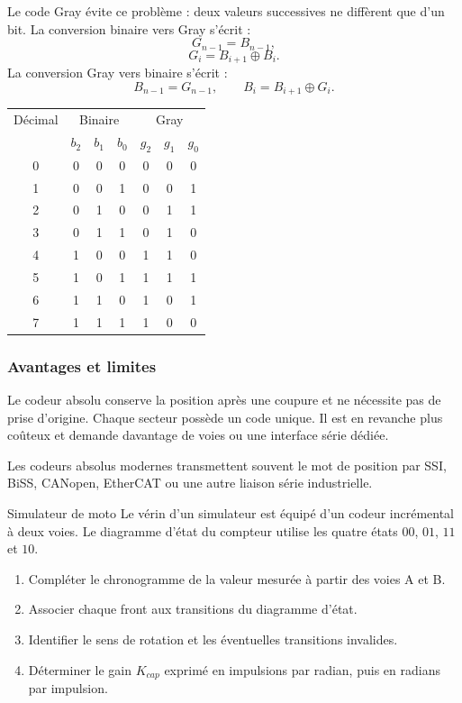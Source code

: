 Le code Gray évite ce problème : deux valeurs successives ne diffèrent que d'un bit. La conversion binaire vers Gray s'écrit :
\[
\boxed{G_{n-1}=B_{n-1},}
\]
\[
\boxed{G_i=B_{i+1}\oplus B_i.}
\]
La conversion Gray vers binaire s'écrit :
\[
\boxed{B_{n-1}=G_{n-1},}
\qquad
\boxed{B_i=B_{i+1}\oplus G_i.}
\]

\begin{center}
\small
\begin{tabular}{c|ccc|ccc}
\toprule
Décimal & \multicolumn{3}{c|}{Binaire} & \multicolumn{3}{c}{Gray}\\
&$b_2$&$b_1$&$b_0$&$g_2$&$g_1$&$g_0$\\
\midrule
0&0&0&0&0&0&0\\
1&0&0&1&0&0&1\\
2&0&1&0&0&1&1\\
3&0&1&1&0&1&0\\
4&1&0&0&1&1&0\\
5&1&0&1&1&1&1\\
6&1&1&0&1&0&1\\
7&1&1&1&1&0&0\\
\bottomrule
\end{tabular}
\end{center}

\subsubsection{Avantages et limites}

Le codeur absolu conserve la position après une coupure et ne nécessite pas de prise d'origine. Chaque secteur possède un code unique. Il est en revanche plus coûteux et demande davantage de voies ou une interface série dédiée.

Les codeurs absolus modernes transmettent souvent le mot de position par SSI, BiSS, CANopen, EtherCAT ou une autre liaison série industrielle.

\begin{TLLogicApplication}{Simulateur de moto}
Le vérin d'un simulateur est équipé d'un codeur incrémental à deux voies. Le diagramme d'état du compteur utilise les quatre états $00$, $01$, $11$ et $10$.
\begin{enumerate}
  \item Compléter le chronogramme de la valeur mesurée à partir des voies A et B.
  \item Associer chaque front aux transitions du diagramme d'état.
  \item Identifier le sens de rotation et les éventuelles transitions invalides.
  \item Déterminer le gain $K_{cap}$ exprimé en impulsions par radian, puis en radians par impulsion.
\end{enumerate}
\end{TLLogicApplication}

